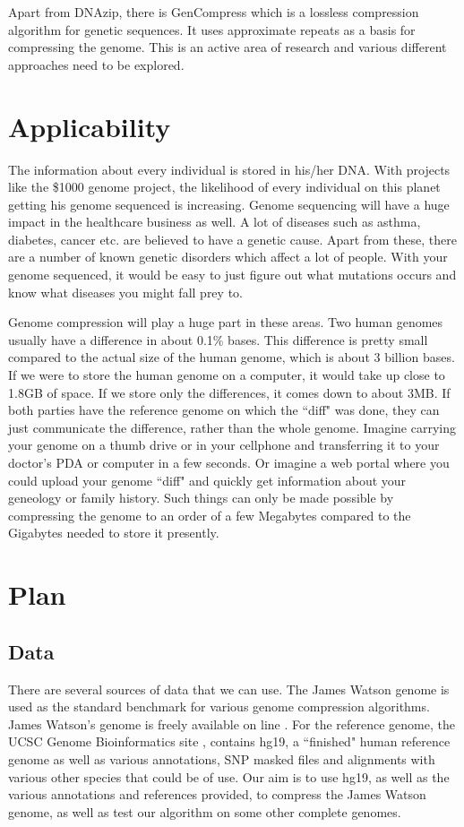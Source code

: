 \documentclass{article}
\begin{document}
Apart from DNAzip, there is GenCompress \cite{gencompress} which is a lossless compression algorithm for genetic sequences. It uses approximate repeats as a basis for compressing the genome. This is an active area of research and various different approaches need to be explored.\\

\section {Applicability}
The information about every individual is stored in his/her DNA. With projects like the \$1000 genome project, the likelihood of every individual on this planet getting his genome sequenced is increasing. Genome sequencing will have a huge impact in the healthcare business as well. A lot of diseases such as asthma, diabetes, cancer etc. are believed to have a genetic cause. Apart from these, there are a number of known genetic disorders which affect a lot of people. With your genome sequenced, it would be easy to just figure out what mutations occurs and know what diseases you might fall prey to. 

Genome compression will play a huge part in these areas. Two human genomes usually have a difference in about 0.1\% bases. This difference is pretty small compared to the actual size of the human genome, which is about 3 billion bases. If we were to store the human genome on a computer, it would take up close to 1.8GB of space. If we store only the differences, it comes down to about 3MB. If both parties have the reference genome on which the ``diff" was done, they can just communicate the difference, rather than the whole genome. Imagine carrying your genome on a thumb drive or in your cellphone and transferring it to your doctor's PDA or computer in a few seconds. Or imagine a web portal where you could upload your genome ``diff" and quickly get information about your geneology or family history. Such things can only be made possible by compressing the genome to an order of a few Megabytes compared to the Gigabytes needed to store it presently.  

\clearpage

\section{Plan}

\subsection{Data}
There are several sources of data that we can use. The James Watson genome is used as the standard benchmark for various genome compression algorithms. James Watson's genome is freely available on line \cite{jwseq}. For the reference genome, the UCSC Genome Bioinformatics site \cite{ucschg}, contains hg19, a ``finished" human reference genome as well as various annotations, SNP masked files and alignments with various other species that could be of use. Our aim is to use hg19, as well as the various annotations and references provided, to compress the James Watson genome, as well as test our algorithm on some other complete genomes. \\
\end{document}

